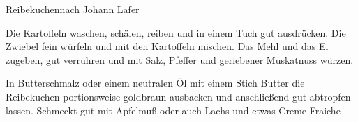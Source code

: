 \begin{recipe}{Reibekuchen}{nach Johann Lafer}
  \inglist
  
  \steps
  Die Kartoffeln waschen, schälen, reiben und in einem Tuch gut ausdrücken. Die Zwiebel
  fein würfeln und mit den Kartoffeln mischen. Das Mehl und das Ei zugeben, gut
  verrühren und mit Salz, Pfeffer und geriebener Muskatnuss würzen.

  In Butterschmalz oder einem neutralen Öl mit einem Stich Butter die Reibekuchen
  portionsweise goldbraun ausbacken und anschließend gut abtropfen lassen. Schmeckt gut
  mit Apfelmuß oder auch Lachs und etwas Creme Fraiche
\end{recipe}
